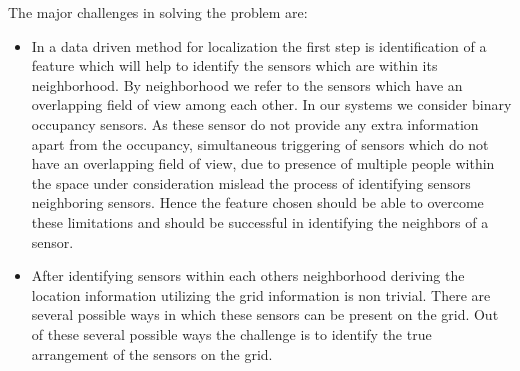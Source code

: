 The major challenges in solving the problem are:
\begin{itemize}
\item In a data driven method for localization the first step is identification of a feature which will help to identify the sensors which are within its neighborhood. By neighborhood we refer to the sensors which have an overlapping field of view among each other. In our systems we consider binary occupancy sensors. As these sensor do not provide any extra information apart from the occupancy, simultaneous triggering of sensors which do not have an overlapping field of view, due to presence of multiple people within the space under consideration mislead the process of identifying sensors neighboring sensors. Hence the feature chosen should be able to overcome these limitations and should be successful in identifying the neighbors of a sensor.
\item After identifying sensors within each others neighborhood deriving the location information utilizing the grid information is non trivial. There are several possible ways in which these sensors can be present on the grid. Out of these several possible ways the challenge is to identify the true arrangement of the sensors on the grid.
\end{itemize}


